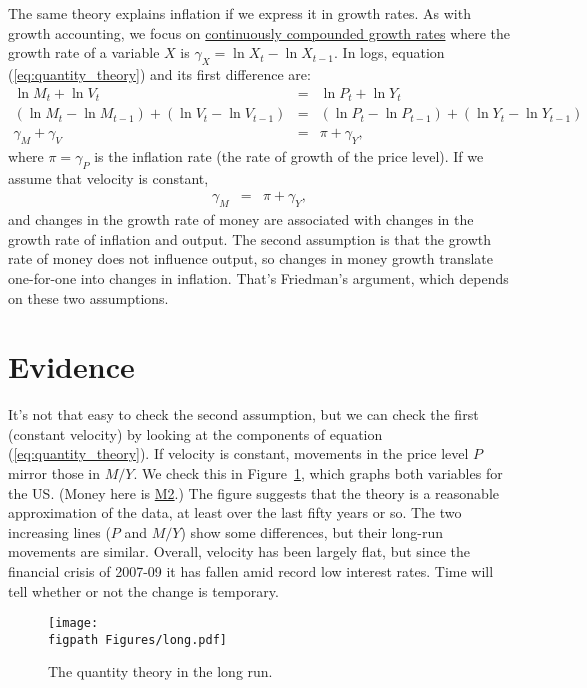 The same theory explains inflation if we express it in growth rates.
As with growth accounting, we focus on \hyperref[sec:growth_math_cc]{continuously compounded growth rates} where the growth rate of a variable $X$ is
$ \gamma_X = \ln X_t - \ln X_{t-1}$.
In logs, equation (\ref{eq:quantity_theory}) and its first difference are:
%
\begin{eqnarray*}
    \ln M_t + \ln V_t &=& \ln P_t + \ln Y_t \\
    (\ln M_t - \ln M_{t-1})  + (\ln V_t - \ln V_{t-1})
                 &=& (\ln P_t - \ln P_{t-1}) + (\ln Y_t - \ln Y_{t-1})\\
    \gamma_M  + \gamma_V &=&  \pi + \gamma_Y ,
\end{eqnarray*}
%
where $\pi = \gamma_P $ is the inflation rate
(the rate of growth of the price level).
If we assume that velocity is constant,
\begin{eqnarray}
    \gamma_M   &=&  \pi + \gamma_Y ,
    \label{eq:quantity_theory-growth}
\end{eqnarray}
and changes in the growth rate of money are associated
with changes in the growth rate of inflation and output.
The second assumption is that the growth rate of money does not influence
output, so changes in money growth translate one-for-one
into changes in inflation.
That's Friedman's argument, which depends on these two assumptions.


\section{Evidence}

It's not that easy to check the second assumption, but we can
check the first (constant velocity) by looking at the components of
equation (\ref{eq:quantity_theory}).
If velocity is constant, movements in the price
level $P$ mirror those in $M/Y$.
We check this in Figure~\ref{fig:quantity_long}, which graphs
both variables for the US.
(Money here is \href{http://research.stlouisfed.org/fred2/series/M2}{M2}.)
The figure suggests that the theory is a reasonable approximation of the data, at least
over the last fifty years or so.
The two increasing lines ($P$ and $M/Y$)
show some differences, but their long-run movements are similar.
Overall, velocity has been largely flat,
but since the financial crisis of 2007-09 it has
fallen amid record low interest rates.
Time will tell whether or not the change is temporary.
%
\begin{figure}[ht]
    \caption{The quantity theory in the long run.}
    \label{fig:quantity_long}
    \centering
    \texttt{[image: \\figpath Figures/long.pdf]}
\end{figure}
%

